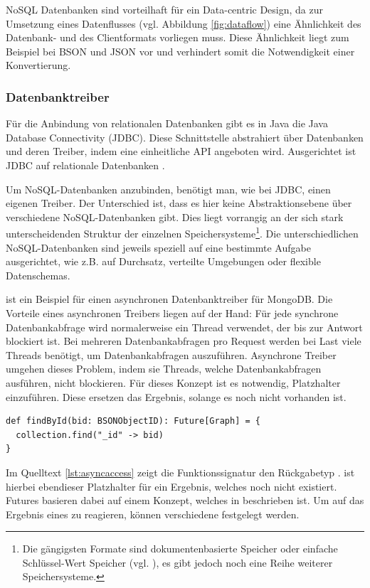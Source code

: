 NoSQL Datenbanken sind vorteilhaft für ein Data-centric Design, da zur Umsetzung eines Datenflusses (vgl. Abbildung \ref{fig:dataflow}) eine Ähnlichkeit des Datenbank- und des Clientformats vorliegen muss. Diese Ähnlichkeit liegt zum Beispiel bei BSON und JSON vor und verhindert somit die Notwendigkeit einer Konvertierung.

\subsubsection{Datenbanktreiber}
\label{sec:reactive}
Für die Anbindung von relationalen Datenbanken gibt es in Java die Java Database Connectivity (JDBC). Diese Schnittstelle abstrahiert über Datenbanken und deren Treiber, indem eine einheitliche API angeboten wird. Ausgerichtet ist JDBC auf relationale Datenbanken \cite{reese2000database}.

Um NoSQL-Datenbanken anzubinden, benötigt man, wie bei JDBC, einen eigenen Treiber. Der Unterschied ist, dass es hier keine Abstraktionsebene über verschiedene NoSQL-Datenbanken gibt. Dies liegt vorrangig an der sich stark unterscheidenden Struktur der einzelnen Speichersysteme\footnote{Die gängigsten Formate sind dokumentenbasierte Speicher oder einfache Schlüssel-Wert Speicher (vgl. \cite{nosql-databases}), es gibt jedoch noch eine Reihe weiterer Speichersysteme.}. Die unterschiedlichen NoSQL-Datenbanken sind jeweils speziell auf eine bestimmte Aufgabe ausgerichtet, wie z.B. auf Durchsatz, verteilte Umgebungen oder flexible Datenschemas. 

 ist ein Beispiel für einen asynchronen Datenbanktreiber für MongoDB. Die Vorteile eines asynchronen Treibers liegen auf der Hand: Für jede synchrone Datenbankabfrage wird normalerweise ein Thread verwendet, der bis zur Antwort blockiert ist. Bei mehreren Datenbankabfragen pro Request werden bei Last viele Threads benötigt, um Datenbankabfragen auszuführen. Asynchrone Treiber umgehen dieses Problem, indem sie Threads, welche Datenbankabfragen ausführen, nicht blockieren. Für dieses Konzept ist es notwendig, Platzhalter einzuführen. Diese ersetzen das Ergebnis, solange es noch nicht vorhanden ist.

\begin{lstlisting}[label=lst:asyncaccess, caption=Funktionssignatur für asynchronen Datenbankzugriff]
def findById(bid: BSONObjectID): Future[Graph] = {
  collection.find("_id" -> bid)
}
\end{lstlisting}
 
Im Quelltext \ref{lst:asyncaccess} zeigt die Funktionssignatur den Rückgabetyp .  ist hierbei ebendieser Platzhalter für ein Ergebnis, welches noch nicht existiert. Futures basieren dabei auf einem Konzept, welches in \cite{future-concept} beschrieben ist. Um auf das Ergebnis eines  zu reagieren, können verschiedene  festgelegt werden.

